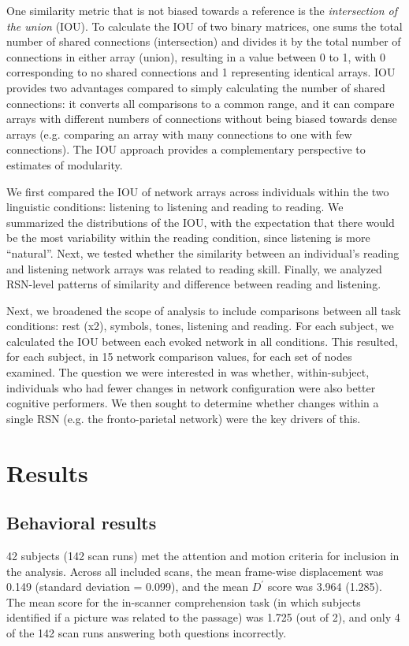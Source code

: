 One similarity metric that is not biased towards a reference is the \textit{intersection of the union} (IOU). To calculate the IOU of two binary matrices, one sums the total number of shared connections (intersection) and divides it by the total number of connections in either array (union), resulting in a value between 0 to 1, with 0 corresponding to no shared connections and 1 representing identical arrays. IOU provides two advantages compared to simply calculating the number of shared connections: it converts all comparisons to a common range, and it can compare arrays with different numbers of connections without being biased towards dense arrays (e.g. comparing an array with many connections to one with few connections). The IOU approach provides a complementary perspective to estimates of modularity.

We first compared the IOU of network arrays across individuals within the two linguistic conditions: listening to listening and reading to reading. We summarized the distributions of the IOU, with the expectation that there would be the most variability within the reading condition, since listening is more ``natural''. Next, we tested whether the similarity between an individual's reading and listening network arrays was related to reading skill. Finally, we analyzed RSN-level patterns of similarity and difference between reading and listening. 

Next, we broadened the scope of analysis to include comparisons between all task conditions: rest (x2), symbols, tones, listening and reading. For each subject, we calculated the IOU between each evoked network in all conditions. This resulted, for each subject, in 15 network comparison values, for each set of nodes examined. The question we were interested in was whether, within-subject, individuals who had fewer changes in network configuration were also better cognitive performers. We then sought to determine whether changes within a single RSN (e.g. the fronto-parietal network) were the key drivers of this. 


\section{Results}

\subsection{Behavioral results}

42 subjects (142 scan runs) met the attention and motion criteria for inclusion in the analysis. Across all included scans, the mean frame-wise displacement was 0.149 (standard deviation = 0.099), and the mean $D^\prime$ score was 3.964 (1.285).  The mean score for the in-scanner comprehension task (in which subjects identified if a picture was related to the passage) was 1.725 (out of 2), and only 4 of the 142 scan runs answering both questions incorrectly.


